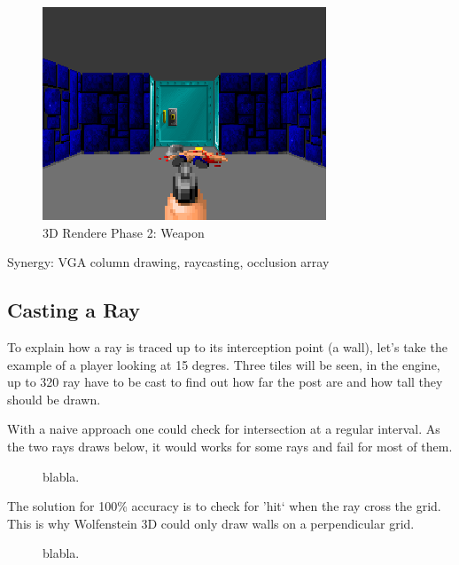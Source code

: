  \begin{figure}[H]
\centering
 \includegraphics[scale=1.3]{screenshots/wolf3d_7_fullframe.png}
 \caption{3D Rendere Phase 2: Weapon} \label{fig:mips}
 \end{figure}
 

   Synergy: VGA column drawing, raycasting, occlusion array














\subsection{Casting a Ray}
To explain how a ray is traced up to its interception point (a wall), let's take the example of a player looking at 15 degres. Three tiles will be seen, in the engine, up to 320 ray have to be cast to find out how far the post are and how tall they should be drawn.
\begin{figure}[H]
\centering
 
\end{figure}


With a naive approach one could check for intersection at a regular interval. As the two rays draws below, it would works for some rays and fail for most of them.
\begin{figure}[H]
\centering
 
 \caption{blabla.}
\end{figure}

The solution for 100\% accuracy is to check for 'hit` when the ray cross the grid. This is why Wolfenstein 3D could only draw walls on a perpendicular grid.
\begin{figure}[H]
\centering
 
 \caption{blabla.}
\end{figure}










